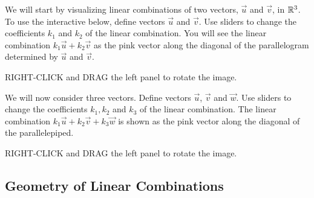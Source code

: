 \documentclass{ximera}
\begin{document}
\begin{exploration}\label{exp:linCombR3}
  We will start by visualizing linear combinations of two vectors, $\vec{u}$ and $\vec{v}$, in $\mathbb{R}^3$.
  To use the interactive below, define vectors $\vec{u}$ and $\vec{v}$.  Use sliders to change the coefficients $k_1$ and $k_2$ of the linear combination.  You will see the linear combination $k_1\vec{u}+k_2\vec{v}$ as the pink vector along the diagonal of the parallelogram determined by $\vec{u}$ and $\vec{v}$. 

  RIGHT-CLICK and DRAG the left panel to rotate the image.


\begin{onlineOnly}
\begin{center} 
\end{center}
\end{onlineOnly}

We will now consider three vectors. Define vectors $\vec{u}$, $\vec{v}$ and $\vec{w}$.  Use sliders to change the coefficients $k_1, k_2$ and $k_3$ of the linear combination.  The linear combination $k_1\vec{u}+k_2\vec{v}+k_3\vec{w}$ is shown as the pink vector along the diagonal of the parallelepiped. 

RIGHT-CLICK and DRAG the left panel to rotate the image.


\begin{onlineOnly}
\begin{center} 
\end{center}
\end{onlineOnly}
\end{exploration}

\subsection*{Geometry of Linear Combinations}
\end{document}
